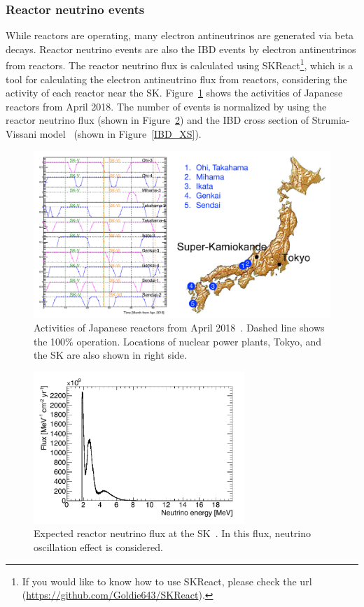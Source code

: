 \subsubsection{Reactor neutrino events}\label{Subsubsec_sim_reactor}
\vs\hs
While reactors are operating, many electron antineutrinos are generated via beta decays.
Reactor neutrino events are also the IBD events by electron antineutrinos from reactors.
The reactor neutrino flux is calculated using SKReact\footnote{If you would like to know how to use SKReact, please check the url (\url{https://github.com/Goldie643/SKReact}).}, which is a tool for calculating the electron antineutrino flux from reactors, considering the activity of each reactor near the SK.
Figure~\ref{Reactor_act} shows the activities of Japanese reactors from April 2018.
The number of events is normalized by using the reactor neutrino flux (shown in Figure~\ref{Reactor_flux}) and the IBD cross section of Strumia-Vissani model~\cite{2003Strumia} (shown in Figure~\ref{IBD_XS}).

\begin{figure}[H]
	\centering
	\includegraphics[width=12cm]{Figures/Simulation/Reactor_act}
	\caption[Activities of Japanese reactors from April 2018]{
	Activities of Japanese reactors from April 2018~\cite{2003Fukuda,2023HaradaPhD}.
	Dashed line shows the 100\% operation.
	Locations of nuclear power plants, Tokyo, and the SK are also shown in right side.
	}\label{Reactor_act}
\end{figure}

\begin{figure}[H]
	\centering
	\includegraphics[width=8cm]{Figures/Simulation/Reactor_flux}
	\caption[Expected reactor neutrino flux at the SK]{
	Expected reactor neutrino flux at the SK~\cite{2023HaradaPhD}.
	In this flux, neutrino oscillation effect is considered.
	}\label{Reactor_flux}
\end{figure}

